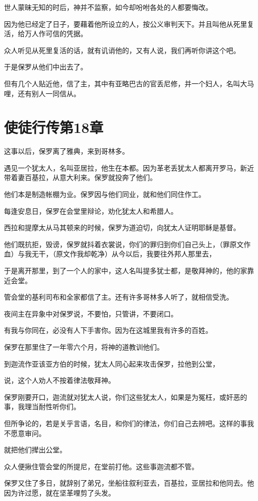 \documentclass[12pt,oneside]{book}
\begin{document}
世人蒙昧无知的时后，神并不监察，如今却吩咐各处的人都要悔改。

因为他已经定了日子，要藉着他所设立的人，按公义审判天下。并且叫他从死里复活，给万人作可信的凭据。

众人听见从死里复活的话，就有讥诮他的，又有人说，我们再听你讲这个吧。

于是保罗从他们中出去了。

但有几个人贴近他，信了主，其中有亚略巴古的官丢尼修，并一个妇人，名叫大马哩，还有别人一同信从。

\chapter{使徒行传第18章}
这事以后，保罗离了雅典，来到哥林多。

遇见一个犹太人，名叫亚居拉，他生在本都。因为革老丢犹太人都离开罗马，新近带着妻百基拉，从意大利来。保罗就投奔了他们。

他们本是制造帐棚为业。保罗因与他们同业，就和他们同住作工。

每逢安息日，保罗在会堂里辩论，劝化犹太人和希腊人。

西拉和提摩太从马其顿来的时候，保罗为道迫切，向犹太人证明耶稣是基督。

他们既抗拒，毁谤，保罗就抖着衣裳说，你们的罪归到你们自己头上，（罪原文作血）与我无干，（原文作我却乾净）从今以后，我要往外邦人那里去，

于是离开那里，到了一个人的家中，这人名叫提多犹士都，是敬拜神的，他的家靠近会堂。

管会堂的基利司布和全家都信了主。还有许多哥林多人听了，就相信受洗。

夜间主在异象中对保罗说，不要怕，只管讲，不要闭口。

有我与你同在，必没有人下手害你。因为在这城里我有许多的百姓。

保罗在那里住了一年零六个月，将神的道教训他们。

到迦流作亚该亚方伯的时候，犹太人同心起来攻击保罗，拉他到公堂，

说，这个人劝人不按着律法敬拜神。

保罗刚要开口，迦流就对犹太人说，你们这些犹太人，如果是为冤枉，或奸恶的事，我理当耐性听你们。

但所争论的，若是关乎言语，名目，和你们的律法，你们自己去辨吧。这样的事我不愿意审问。

就把他们撵出公堂。

众人便揪住管会堂的所提尼，在堂前打他。这些事迦流都不管。

保罗又住了多日，就辞别了弟兄，坐船往叙利亚去，百基拉，亚居拉和他同去。他因为许过愿，就在坚革哩剪了头发。
\end{document}
